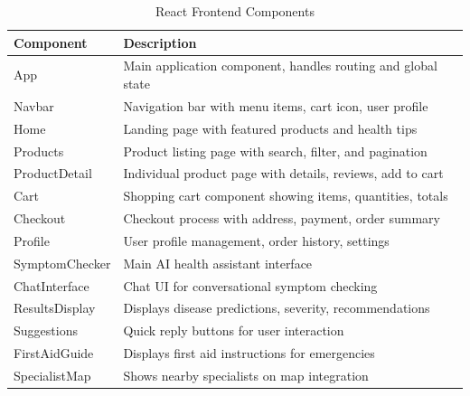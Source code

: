 \documentclass[12pt,a4paper]{article}
\begin{document}
\begin{table}[H]
\centering
\caption{React Frontend Components}
\label{tab:reactcomponents}
\begin{tabularx}{\textwidth}{|l|X|}
\hline
\textbf{Component} & \textbf{Description} \\
\hline
App & Main application component, handles routing and global state \\
\hline
Navbar & Navigation bar with menu items, cart icon, user profile \\
\hline
Home & Landing page with featured products and health tips \\
\hline
Products & Product listing page with search, filter, and pagination \\
\hline
ProductDetail & Individual product page with details, reviews, add to cart \\
\hline
Cart & Shopping cart component showing items, quantities, totals \\
\hline
Checkout & Checkout process with address, payment, order summary \\
\hline
Profile & User profile management, order history, settings \\
\hline
SymptomChecker & Main AI health assistant interface \\
\hline
ChatInterface & Chat UI for conversational symptom checking \\
\hline
ResultsDisplay & Displays disease predictions, severity, recommendations \\
\hline
Suggestions & Quick reply buttons for user interaction \\
\hline
FirstAidGuide & Displays first aid instructions for emergencies \\
\hline
SpecialistMap & Shows nearby specialists on map integration \\
\hline
\end{tabularx}
\end{table}
\end{document}
